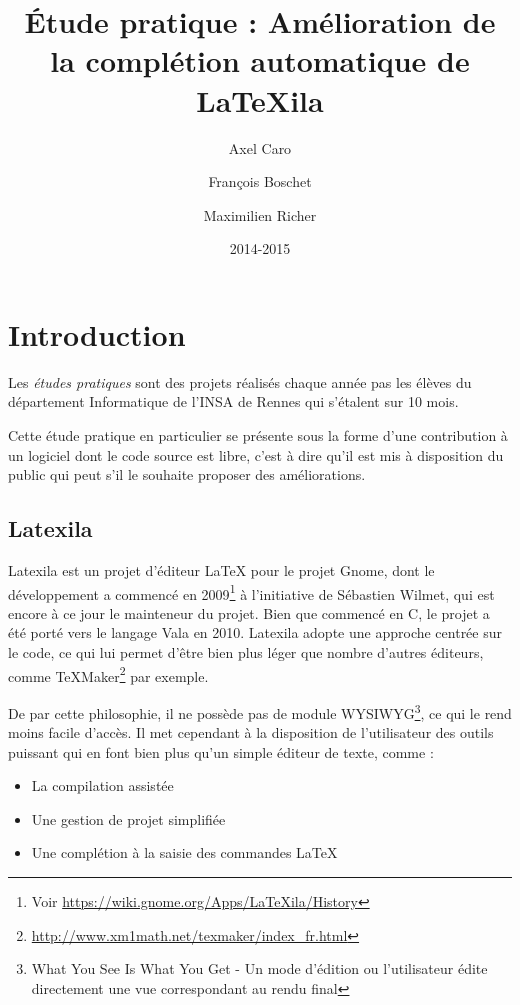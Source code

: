 \documentclass[a4paper,11pt]{report}
\title{Étude pratique : Amélioration de la complétion automatique de \LaTeX{}ila}
\author{Axel Caro\and François Boschet\and Maximilien Richer}
\date{2014-2015}
\begin{document}


\maketitle %
\tableofcontents %
\newpage

\chapter{Introduction}
\label{cha:Introduction}

Les \textit{études pratiques} sont des projets réalisés chaque année pas les élèves du département Informatique de l'INSA de Rennes qui s'étalent sur 10 mois.

Cette étude pratique en particulier se présente sous la forme d'une contribution à un logiciel dont le code source est libre, c'est à dire qu'il est mis à disposition du public qui peut s'il le souhaite proposer des améliorations.

\section{Latexila}
\label{sec:latexila}
Latexila est un projet d'éditeur LaTeX pour le projet Gnome, dont le développement a commencé en 2009\footnote{Voir \url{https://wiki.gnome.org/Apps/LaTeXila/History}} à l'initiative de Sébastien Wilmet, qui est encore à ce jour le mainteneur du projet.
Bien que commencé en C, le projet a été porté vers le langage Vala en 2010. Latexila adopte une approche centrée sur le code, ce qui lui permet d'être bien plus léger que nombre d'autres éditeurs, comme TeXMaker\footnote{\url{http://www.xm1math.net/texmaker/index_fr.html}} par exemple.

De par cette philosophie, il ne possède pas de module WYSIWYG\footnote{What You See Is What You Get - Un mode d'édition ou l'utilisateur édite directement une vue correspondant au rendu final}, ce qui le rend moins facile d'accès.
Il met cependant à la disposition de l'utilisateur des outils puissant qui en font bien plus qu'un simple éditeur de texte, comme :

\begin{itemize}
	\item La compilation assistée
	\item Une gestion de projet simplifiée
	\item Une complétion à la saisie des commandes \LaTeX
\end{itemize}
\end{document}
